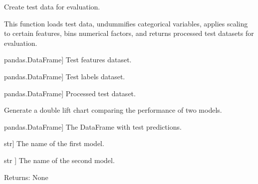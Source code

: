 \documentclass[letterpaper,10pt,english]{sphinxmanual}
\begin{document}
\begin{fulllineitems}
\label{\detokenize{utils:utils.create_test_data}}
\pysigstartsignatures
{}
\pysigstopsignatures
\sphinxAtStartPar
Create test data for evaluation.

\sphinxAtStartPar
This function loads test data, undummifies categorical variables,
applies scaling to certain features, bins numerical factors, and returns
processed test datasets for evaluation.
\begin{description}
\begin{description}
\sphinxlineitem{X\_test}{[}pandas.DataFrame{]}
\sphinxAtStartPar
Test features dataset.

\sphinxlineitem{y\_test}{[}pandas.DataFrame{]}
\sphinxAtStartPar
Test labels dataset.

\sphinxlineitem{df\_test}{[}pandas.DataFrame{]}
\sphinxAtStartPar
Processed test dataset.

\end{description}

\end{description}

\end{fulllineitems}


\begin{fulllineitems}
\label{\detokenize{utils:utils.double_lift_rebase}}
\pysigstartsignatures
{}
\pysigstopsignatures
\sphinxAtStartPar
Generate a double lift chart comparing the performance of two models.
\begin{description}
\begin{description}
\sphinxlineitem{df\_test\_pred}{[}pandas.DataFrame{]}
\sphinxAtStartPar
The DataFrame with test predictions.

\sphinxlineitem{model1}{[}str{]}
\sphinxAtStartPar
The name of the first model.

\sphinxlineitem{model2}{[}str {]}
\sphinxAtStartPar
The name of the second model.

\end{description}

\end{description}

\sphinxAtStartPar
Returns:
\sphinxhyphen{} None

\end{fulllineitems}
\end{document}

